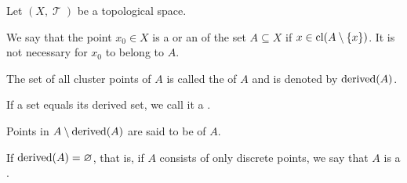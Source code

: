 \begin{definition}\label{def:topological_derived_set}
  Let \( (X, \mscrT) \) be a topological space.

  \begin{DefEnum}
     We say that the point \( x_0 \in X \) is a  or an  of the set \( A \subseteq X \) if \( x \in \operatorname{cl}(A \setminus \{ x \}) \). It is not necessary for \( x_0 \) to belong to \( A \).

     The set of all cluster points of \( A \) is called the  of \( A \) and is denoted by \( \operatorname{derived}(A) \).

     If a set equals its derived set, we call it a .

     Points in \( A \setminus \operatorname{derived}(A) \) are said to be  of \( A \).

     If \( \operatorname{derived}(A) = \varnothing \), that is, if \( A \) consists of only discrete points, we say that \( A \) is a .
  \end{DefEnum}
\end{definition}


